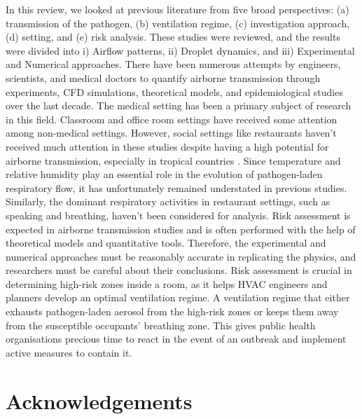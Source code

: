 \documentclass[a4paper,12pt]{elsarticle}
\begin{document}
In this review, we looked at previous literature from five broad perspectives: (a) transmission of the pathogen, (b) ventilation regime, (c) investigation approach, (d) setting, and (e) risk analysis. These studies were reviewed, and the results were divided into i) Airflow patterns, ii) Droplet dynamics, and iii) Experimental and Numerical approaches. There have been numerous attempts by engineers, scientists, and medical doctors to quantify airborne transmission through experiments, CFD simulations, theoretical models, and epidemiological studies over the last decade. The medical setting has been a primary subject of research in this field. Classroom and office room settings have received some attention among non-medical settings. However, social settings like restaurants haven't received much attention in these studies despite having a high potential for airborne transmission, especially in tropical countries \cite{prata2020temperature}. Since temperature and relative humidity play an essential role in the evolution of pathogen-laden respiratory flow, it has unfortunately remained understated in previous studies. Similarly, the dominant respiratory activities in restaurant settings, such as speaking and breathing, haven't been considered for analysis. Risk assessment is expected in airborne transmission studies and is often performed with the help of theoretical models and quantitative tools. Therefore, the experimental and numerical approaches must be reasonably accurate in replicating the physics, and researchers must be careful about their conclusions. Risk assessment is crucial in determining high-risk zones inside a room, as it helps HVAC engineers and planners develop an optimal ventilation regime. A ventilation regime that either exhausts pathogen-laden aerosol from the high-risk zones or keeps them away from the susceptible occupants' breathing zone. This gives public health organisations precious time to react in the event of an outbreak and implement active measures to contain it.


\section*{Acknowledgements}



  
 

\appendix





\end{document}
